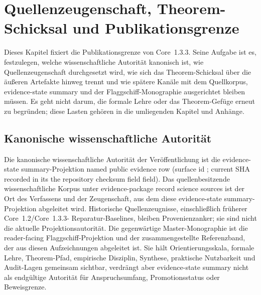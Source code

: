 \section{Quellenzeugenschaft, Theorem-Schicksal und Publikationsgrenze}
\label{sec:oc13-publication-boundary}

Dieses Kapitel fixiert die Publikationsgrenze von Core~1.3.3. Seine Aufgabe ist
es, festzulegen, welche wissenschaftliche Autorität kanonisch ist, wie
Quellenzeugenschaft durchgesetzt wird, wie sich das Theorem-Schicksal über die
äußeren Artefakte hinweg trennt und wie spätere Kanäle mit dem Quellkorpus,
evidence-state summary und der Flaggschiff-Monographie ausgerichtet bleiben müssen. Es geht
nicht darum, die formale Lehre oder das Theorem-Gefüge erneut zu begründen;
diese Lasten gehören in die umliegenden Kapitel und Anhänge.

\subsection{Kanonische wissenschaftliche Autorität}

Die kanonische wissenschaftliche Autorität der Veröffentlichung ist die
evidence-state summary-Projektion
named public evidence row
(surface id ; current SHA recorded in its
the repository checksum field field). Das quellenbesitzende wissenschaftliche
Korpus unter
evidence-package record science sources ist der Ort des
Verfassens und der Zeugenschaft, aus dem diese evidence-state summary-Projektion abgeleitet wird.
Historische Quellenzeugnisse, einschließlich früherer Core~1.2/Core~1.3.3-
Reparatur-Baselines, bleiben Provenienzanker; sie sind nicht die aktuelle
Projektionsautorität. Die gegenwärtige Master-Monographie ist die
reader-facing Flaggschiff-Projektion und der zusammengestellte Referenzband,
der aus diesen Aufzeichnungen abgeleitet ist. Sie hält Orientierungsskala,
formale Lehre, Theorem-Pfad, empirische Disziplin, Synthese, praktische
Nutzbarkeit und Audit-Lagen gemeinsam sichtbar, verdrängt aber evidence-state summary nicht als
endgültige Autorität für Anspruchsumfang, Promotionsstatus oder Beweisgrenze.

